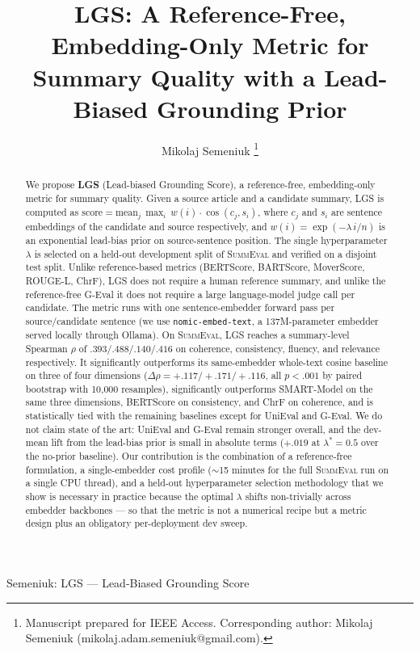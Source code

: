 \documentclass[journal]{IEEEtran}
\begin{document}
\title{LGS: A Reference-Free, Embedding-Only Metric for Summary
Quality with a Lead-Biased Grounding Prior}

\author{%
  Mikolaj Semeniuk%
  \thanks{Manuscript prepared for IEEE Access. Corresponding author:
  Mikolaj Semeniuk (mikolaj.adam.semeniuk@gmail.com).}%
}

%
{Semeniuk: LGS --- Lead-Biased Grounding Score}

\maketitle

\begin{abstract}
We propose \textbf{LGS} (Lead-biased Grounding Score), a
reference-free, embedding-only metric for summary quality. Given a
source article and a candidate summary, LGS is computed as
$\mathrm{score} = \mathrm{mean}_j\, \max_i\, w(i)\cdot
\cos(c_j, s_i)$, where $c_j$ and $s_i$ are sentence embeddings of
the candidate and source respectively, and
$w(i)=\exp(-\lambda\, i/n)$ is an exponential lead-bias prior on
source-sentence position. The single hyperparameter $\lambda$ is
selected on a held-out development split of \textsc{SummEval} and
verified on a disjoint test split. Unlike reference-based metrics
(BERTScore, BARTScore, MoverScore, ROUGE-L, ChrF), LGS does not
require a human reference summary, and unlike the reference-free
G-Eval it does not require a large language-model judge call per
candidate. The metric runs with one sentence-embedder forward pass
per source/candidate sentence (we use \texttt{nomic-embed-text}, a
137M-parameter embedder served locally through Ollama). On \textsc{SummEval}, LGS reaches a summary-level Spearman $\rho$
of $.393/.488/.140/.416$ on coherence, consistency, fluency, and
relevance respectively. It significantly outperforms its
same-embedder whole-text cosine baseline on three of four
dimensions ($\Delta\rho{=}+.117/{+}.171/{+}.116$, all $p{<}.001$
by paired bootstrap with 10{,}000 resamples), significantly
outperforms SMART-Model on the same three dimensions, BERTScore
on consistency, and ChrF on coherence, and is statistically tied
with the remaining baselines except for UniEval and G-Eval. We
do not claim state of the art: UniEval and G-Eval remain stronger
overall, and the dev-mean lift from the lead-bias prior is small
in absolute terms ($+.019$ at $\lambda^{*}{=}0.5$ over the
no-prior baseline). Our contribution is the combination of a
reference-free formulation, a single-embedder cost profile
($\sim$15 minutes for the full \textsc{SummEval} run on a single
CPU thread), and a held-out hyperparameter selection methodology
that we show is necessary in practice because the optimal
$\lambda$ shifts non-trivially across embedder backbones --- so
that the metric is not a numerical recipe but a metric design
plus an obligatory per-deployment dev sweep.
\end{abstract}
\end{document}
